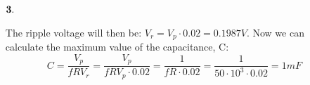 \documentclass[11pt,a4paper]{article}
\begin{document}
\begin{enumerate}
\begin{enumerate}
  \item[$\bold{3.}$]
  
  	The ripple voltage will then be: $V_r = V_p \cdot 0.02 = 0.1987 V$. Now we can calculate the maximum value of the capacitance, C: $$ C = \dfrac{V_p}{f R V_r} = \dfrac{V_p}{f R V_p \cdot 0.02} = \dfrac{1}{f R \cdot 0.02} = \dfrac{1}{50 \cdot 10^3 \cdot 0.02} = 1mF $$
  
\end{enumerate}

  
\end{enumerate}
\end{document}
